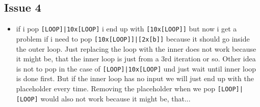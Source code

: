 \documentclass[11pt]{article}
\begin{document}
\subsection{Issue 4}
\begin{itemize}
\item if i pop \verb/[LOOP]|10x[LOOP]/ i end up with \verb/[10x[LOOP]]/ but now i get a problem if i need to pop \verb/[10x[LOOP]]|[2x[b]]/ because it should go inside the outer loop. Just replacing the loop with the inner does not work because it might be, that the inner loop is just from a 3rd iteration or so. Other idea is not to pop in the case of \verb/[LOOP]|10x[LOOP]/ und just wait until inner loop is done first. But if the inner loop has no input we will just end up with the placeholder every time. Removing the placeholder when we pop \verb/[LOOP]|[LOOP]/ would also not work because it might be, that...

\end{itemize}
\end{document}
